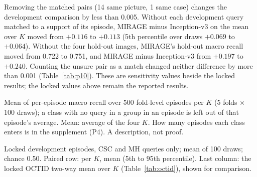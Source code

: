 \documentclass[conference]{IEEEtran}
\begin{document}
Removing the matched pairs (14 same picture, 1 same case) changes the development comparison by less than 0.005. Without each development query matched to a support of its episode, MIRAGE minus Inception-v3 on the mean over $K$ moved from $+0.116$ to $+0.113$ (5th percentile over draws $+0.069$ to $+0.064$). Without the four hold-out images, MIRAGE's hold-out macro recall moved from 0.722 to 0.751, and MIRAGE minus Inception-v3 from $+0.197$ to $+0.240$. Counting the unsure pair as a match changed neither difference by more than 0.001 (Table~\ref{tab:p10}). These are sensitivity values beside the locked results; the locked values above remain the reported results.

\begin{table}[t]
\caption{Post hoc (P4; rule committed 16 Nov 2026, computed 16 Nov 2026). Development macro recall on queries the size-only rule names correctly (size-right) and wrongly (size-wrong), in the same episodes.}
\label{tab:p4}
\centering\footnotesize
\setlength{\tabcolsep}{4pt}

\par\smallskip
\parbox{\columnwidth}{\footnotesize Mean of per-episode macro recall over 500 fold-level episodes per $K$ (5 folds $\times$ 100 draws); a class with no query in a group in an episode is left out of that episode's average. Mean: average of the four $K$. How many episodes each class enters is in the supplement (P4). A description, not proof.}
\end{table}

\begin{table}[t]
\caption{Post hoc (P8; rule committed 16 Nov 2026, computed 16 Nov 2026). CSC against MH on the development images, two-way (larger of the two cosines, ties to CSC): the like-for-like comparator for Table~\ref{tab:octid}.}
\label{tab:p8}
\centering\footnotesize

\par\smallskip
\parbox{\textwidth}{\footnotesize Locked development episodes, CSC and MH queries only; mean of 100 draws; chance 0.50. Paired row: per $K$, mean (5th to 95th percentile). Last column: the locked OCTID two-way mean over $K$ (Table~\ref{tab:octid}), shown for comparison.}
\end{table}
\end{document}
